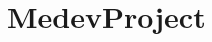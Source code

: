 \chapter{Medev\+Project}
\hypertarget{md__r_e_a_d_m_e}{}\label{md__r_e_a_d_m_e}
\label{md__r_e_a_d_m_e_autotoc_md0}%
%
